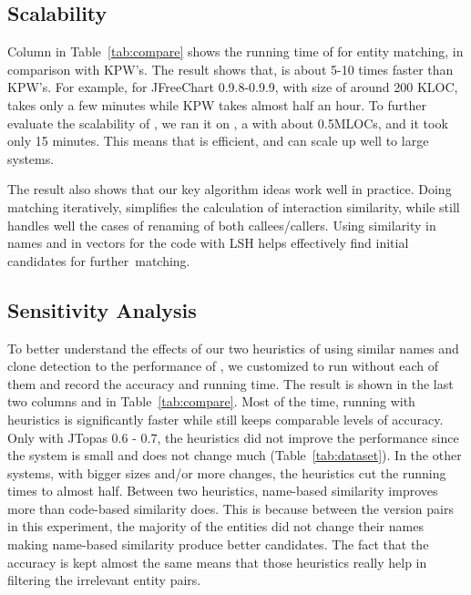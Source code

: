 
\subsection{Scalability}

Column  in Table~\ref{tab:compare} shows the running
time of {\tool} for entity matching, in comparison with KPW's. The
result shows that, {\tool} is about 5-10 times
faster than KPW's. For example, for JFreeChart
0.9.8-0.9.9, with size of around 200 KLOC, {\tool} takes only
a few minutes while KPW takes almost half an hour.  To further
evaluate the scalability of {\tool}, we ran it on , a
with about 0.5MLOCs, and it took only 15
minutes. This means that {\tool} is efficient, and can
scale up well to large systems.

The result also shows that our key algorithm ideas work well in
practice. Doing matching iteratively, {\tool} simplifies the
calculation of interaction similarity, while still handles well the
cases of renaming of both callees/callers. Using similarity in names and
in vectors for the code with LSH helps {\tool} effectively find
initial candidates for further~matching.

\subsection{Sensitivity Analysis}

To better understand the effects of our two heuristics
of using similar names and clone detection
to the performance of {\tool}, we customized {\tool} to run without
each of them and record the accuracy and running time. The result is
shown in the last two columns  and  in Table~\ref{tab:compare}. Most of the time, running
with heuristics is significantly faster while still keeps comparable
levels of accuracy. Only with JTopas 0.6 - 0.7, the heuristics did not
improve the performance since the system is small and does not change much
(Table~\ref{tab:dataset}). In the other systems, with bigger sizes and/or
more changes, the heuristics cut the running times to almost half. Between
two heuristics, name-based similarity improves more than code-based similarity does. This is because between the version pairs in this experiment, the majority of the entities did not change their names making name-based similarity produce better candidates.
The fact that the accuracy is kept almost the same means that those
heuristics really help in filtering the irrelevant entity pairs.

